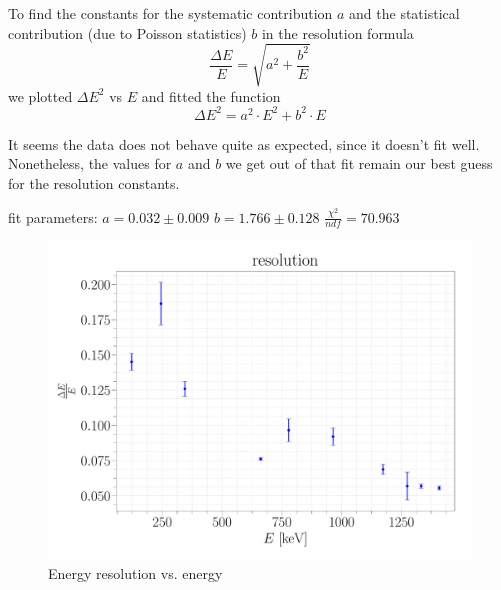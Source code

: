 \documentclass[a4paper,12pt]{article}
\begin{document}
To find the constants for the systematic contribution $a$ and the statistical contribution (due to Poisson statistics) $b$ in the resolution formula 
\begin{equation}
	\frac{\Delta E}{E} = \sqrt{a^2+ \frac{b^2}{E}}
\end{equation}
we plotted $\Delta E^2$ vs $E$ and fitted the function 
\begin{equation}
	\Delta E^2 = a^2 \cdot E^2 + b^2 \cdot E
\end{equation}

It seems the data does not behave quite as expected, since it doesn't fit well. Nonetheless, the values for $a$ and $b$ we get out of that fit remain our best guess for the resolution constants.
\newline

fit parameters: \newline
$a = 0.032\pm0.009$ \newline
$b = 1.766\pm0.128$ \newline
$\frac{\chi^2}{ndf} = 70.963$ \newline

\begin{figure}[H]
\centering
\includegraphics[scale=0.25]{../Figures/resolution.pdf}
\caption{Energy resolution vs. energy}
\label{resolution}
\end{figure}
\newpage
\end{document}
